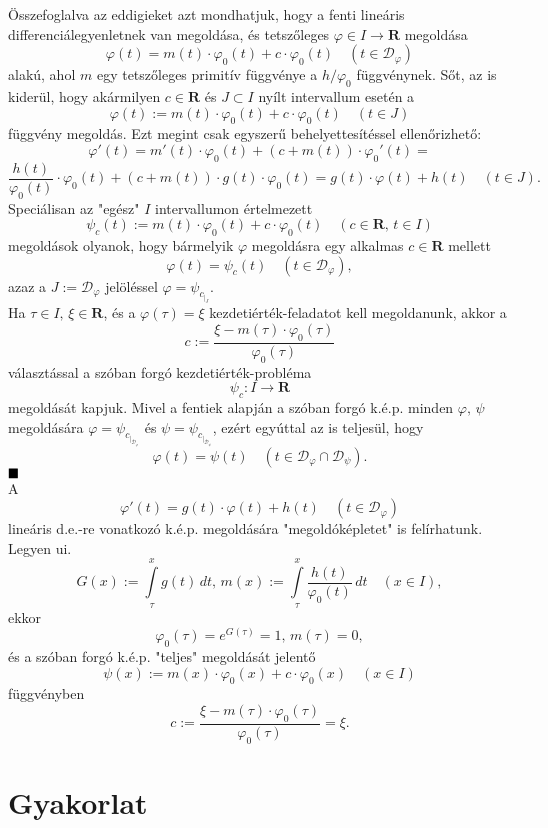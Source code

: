 \documentclass{article}
\newcommand{\R}{\mathbf{R}}
\newcommand{\Dp}{\mathcal{D}_\varphi}
\begin{document}
	Összefoglalva az eddigieket azt mondhatjuk, hogy a fenti lineáris differenciálegyenletnek van megoldása, és tetszőleges $\varphi \in I \to \R$ megoldása
	\[
		\varphi(t) = m(t) \cdot \varphi_0(t) + c \cdot \varphi_0(t) \quad (t \in \Dp)
	\]
	alakú, ahol $m$ egy tetszőleges primitív függvénye a $h / \varphi_0$ függvénynek. Sőt, az is kiderül, hogy akármilyen $c \in \R$ és $J \subset I$ nyílt intervallum esetén a
	\[
		\varphi(t) := m(t) \cdot \varphi_0(t) + c \cdot \varphi_0(t) \quad (t \in J)
	\]
	függvény megoldás. Ezt megint csak egyszerű behelyettesítéssel ellenőrizhető:
	\[
		\varphi'(t) = m'(t) \cdot \varphi_0(t) + (c + m(t)) \cdot \varphi_0'(t) =
	\]
	\[
		\frac{h(t)}{\varphi_0(t)} \cdot \varphi_0(t) + (c + m(t)) \cdot g(t) \cdot \varphi_0(t) = g(t) \cdot \varphi(t) + h(t) \quad (t \in J).
	\]
	Speciálisan az "egész" $I$ intervallumon értelmezett
	\[
		\psi_c(t) := m(t) \cdot \varphi_0(t) + c \cdot \varphi_0(t) \quad (c \in \R, \, t \in I)
	\]
	megoldások olyanok, hogy bármelyik $\varphi$ megoldásra egy alkalmas $c \in \R$ mellett
	\[
		\varphi(t) = \psi_c(t) \quad (t \in \Dp),
	\]
	azaz a $J := \Dp$ jelöléssel $\varphi = \psi_{c_{|_J}}$.\\
	
	Ha $\tau \in I, \, \xi \in \R$, és a $\varphi(\tau) = \xi$ kezdetiérték-feladatot kell megoldanunk, akkor a
	\[
		c := \frac{\xi - m(\tau) \cdot \varphi_0(\tau)}{\varphi_0(\tau)}
	\]
	választással a szóban forgó kezdetiérték-probléma
	\[
		\psi_c : I \to \R
	\]
	megoldását kapjuk. Mivel a fentiek alapján a szóban forgó k.é.p. minden $\varphi, \, \psi$ megoldására $\varphi = \psi_{c_{|_{\Dp}}}$ és $\psi = \psi_{c_{|_{\mathcal{D}_\psi}}}$, ezért egyúttal az is teljesül, hogy
	\[
		\varphi(t) = \psi(t) \quad (t \in \Dp \cap \mathcal{D}_\psi).
	\]
	$\hfill \blacksquare$\\
	
	A
	\[
		\varphi'(t) = g(t) \cdot \varphi(t) + h(t) \quad (t \in \Dp)
	\]
	lineáris d.e.-re vonatkozó k.é.p. megoldására "megoldóképletet" is felírhatunk. Legyen ui.
	\[
		G(x) := \int\limits_\tau^x g(t) \, dt, \, m(x) := \int\limits_\tau^x \frac{h(t)}{\varphi_0(t)} \, dt \quad (x \in I),
	\]
	ekkor
	\[
		\varphi_0(\tau) = e^{G(\tau)} = 1, \, m(\tau) = 0,
	\]
	és a szóban forgó k.é.p. "teljes" megoldását jelentő
	\[
		\psi(x) := m(x) \cdot \varphi_0(x) + c \cdot \varphi_0(x) \quad (x \in I)
	\]
	függvényben
	\[
		c := \frac{\xi - m(\tau) \cdot \varphi_0(\tau)}{\varphi_0(\tau)} = \xi.
	\]
	
	\newpage
	\section{Gyakorlat}
\end{document}
